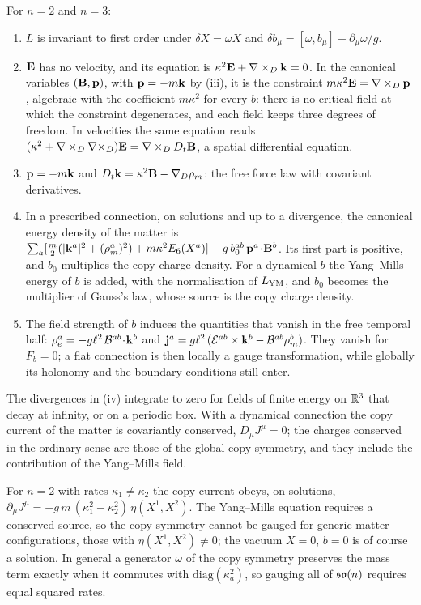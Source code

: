 \begin{theorem}
\label{thm:gauged}
For $n=2$ and $n=3$:
\begin{enumerate}[label=(\roman*),leftmargin=2.2em,itemsep=1pt]
\item $L$ is invariant to first order under $\delta X=\omega X$ and $\delta b_\mu=[\omega,b_\mu]-\partial_\mu\omega/g$.
\item $\mathbf E$ has no velocity, and its equation is $\kappa^2\mathbf E+\nabla\times_D\mathbf k=0$. In the canonical variables $(\mathbf B,\mathbf p)$, with $\mathbf p=-m\mathbf k$ by
(iii), it is the constraint $m\kappa^2\mathbf E=\nabla\times_D\mathbf p$, algebraic with the coefficient $m\kappa^2$ for every $b$: there is no critical field
at which the constraint degenerates, and each field keeps three degrees of freedom. In velocities the same equation reads
$(\kappa^2+\nabla\times_D\nabla\times_D)\mathbf E=\nabla\times_DD_t\mathbf B$, a spatial differential equation.
\item $\mathbf p=-m\mathbf k$ and $D_t\mathbf k=\kappa^2\mathbf B-\nabla_D\rho_m$: the free force law with covariant derivatives.
\item In a prescribed connection, on solutions and up to a divergence, the canonical energy density of the matter is
$\sum_a[\tfrac m2(|\mathbf k^a|^2+(\rho_m^a)^2)+m\kappa^2E_6(X^a)]-g\,b_0^{ab}\,\mathbf p^a\!\cdot\!\mathbf B^b$. Its first part is positive, and $b_0$
multiplies the copy charge density. For a dynamical $b$ the Yang--Mills energy of $b$ is added, with the normalisation of $L_{\rm YM}$, and
$b_0$ becomes the multiplier of Gauss's law, whose source is the copy charge density.
\item The field strength of $b$ induces the quantities that vanish in the free temporal half:
$\rho_e^a=-g\ell^2\,\mathcal B^{ab}\!\cdot\!\mathbf k^b$ and $\mathbf j^a=g\ell^2\,(\mathcal E^{ab}\times\mathbf k^b-\mathcal B^{ab}\rho_m^b)$. They vanish for $F_b=0$; a flat
connection is then locally a gauge transformation, while globally its holonomy and the boundary conditions still enter.
\end{enumerate}
\end{theorem}

The divergences in (iv) integrate to zero for fields of finite energy on $\mathbb{R}^3$ that decay at infinity, or on a periodic box. With a
dynamical connection the copy current of the matter is covariantly conserved, $D_\mu J^\mu=0$; the charges conserved in the ordinary sense
are those of the global copy symmetry, and they include the contribution of the Yang--Mills field.

\begin{proposition}
\label{prop:equalrates}
For $n=2$ with rates $\kappa_1\ne\kappa_2$ the copy current obeys, on solutions,
$\partial_\mu J^\mu=-g\,m\,(\kappa_1^2-\kappa_2^2)\,\eta(X^1,X^2)$. The Yang--Mills equation requires a conserved source, so the copy
symmetry cannot be gauged for generic matter configurations, those with $\eta(X^1,X^2)\ne0$; the vacuum $X=0$, $b=0$ is of course a
solution. In general a generator $\omega$ of the copy symmetry preserves the mass term exactly when it commutes with
$\mathrm{diag}(\kappa_a^2)$, so gauging all of $\mathfrak{so}(n)$ requires equal squared rates.
\end{proposition}

